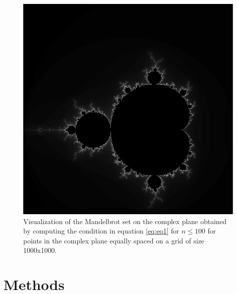 \documentclass[10pt,a4paper]{article}
\begin{document}
\begin{figure}[H]
  \centering
  \includegraphics[scale=0.6]{mandelbrot.pdf}
  \caption{Visualization of the Mandelbrot set on the complex plane obtained by computing the condition in equation \ref{eq:eq1} for $n \leq 100$ for points in the complex plane equally spaced on a grid of size 1000x1000.}
  \label{fig:mandelbrot}
\end{figure}

\section{Methods}
\end{document}
